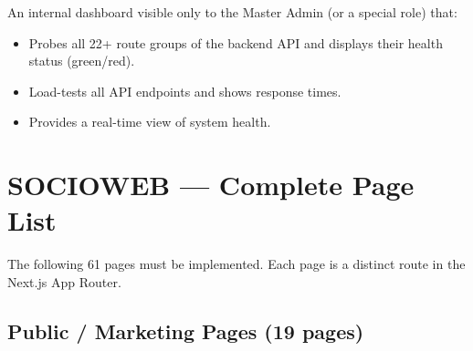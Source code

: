 \documentclass[12pt,a4paper]{article}
\begin{document}
An internal dashboard visible only to the Master Admin (or a special role) that:

\begin{itemize}[leftmargin=*]
    \item Probes all 22+ route groups of the backend API and displays their health status (green/red).
    \item Load-tests all API endpoints and shows response times.
    \item Provides a real-time view of system health.
\end{itemize}

\newpage
\section{SOCIOWEB — Complete Page List}

The following 61 pages must be implemented. Each page is a distinct route in the Next.js App Router.

\subsection{Public / Marketing Pages (19 pages)}
\end{document}
